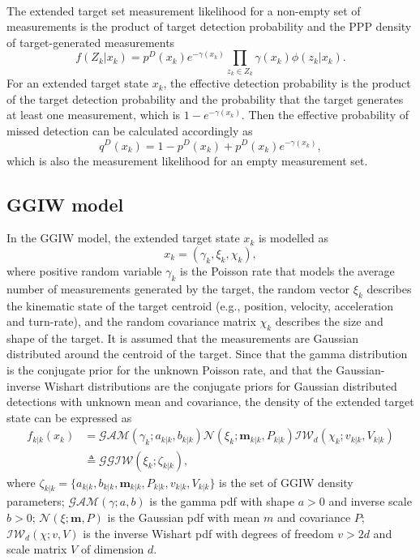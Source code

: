 ~\\
The extended target set measurement likelihood for a non-empty set of measurements is the product of target detection probability and the PPP density of target-generated measurements \cite{pmbmextended2}
\begin{equation}
    f(Z_k|x_k) = p^D(x_k)e^{-\gamma(x_k)}\prod_{z_k\in Z_k}\gamma(x_k)\phi(z_k|x_k).
    \label{eq:extendedlikelihood}
\end{equation}
For an extended target state $x_k$, the effective detection probability is the product of the target detection probability and the probability that the target generates at least one measurement, which is $1-e^{-\gamma(x_k)}$. Then the effective probability of missed detection can be calculated accordingly as
\begin{equation}
    q^D(x_k) = 1 - p^D(x_k) + p^D(x_k)e^{-\gamma(x_k)},
\end{equation}
which is also the measurement likelihood for an empty measurement set.

\subsection{GGIW model}
In the GGIW model, the extended target state $x_k$ is modelled as 
\begin{equation}
    x_k=(\gamma_k,\xi_k,\chi_k),
\end{equation}
where positive random variable $\gamma_k$ is the Poisson rate that models the average number of measurements generated by the target, the random vector $\xi_k$ describes the kinematic state of the target centroid (e.g., position, velocity, acceleration and turn-rate), and the random covariance matrix $\chi_k$ describes the size and shape of the target. It is assumed that the measurements are Gaussian distributed around the centroid of the target. Since that the gamma distribution is the conjugate prior for the unknown Poisson rate, and that the Gaussian-inverse Wishart distributions are the conjugate priors for Gaussian distributed detections with unknown mean and covariance, the density of the extended target state can be expressed as
\begin{align}
f_{k|k}(x_k) &= \mathcal{GAM}(\gamma_k;a_{k|k},b_{k|k})\mathcal{N}(\xi_k;\mathbf{m}_{k|k},P_{k|k})\mathcal{IW}_d(\chi_k;v_{k|k},V_{k|k}) \\
&\triangleq \mathcal{GGIW}(\xi_k;\zeta_{k|k}),
\end{align}
where $\zeta_{k|k} = \{a_{k|k},b_{k|k},\mathbf{m}_{k|k},P_{k|k},v_{k|k},V_{k|k}\}$ is the set of GGIW density parameters; $\mathcal{GAM}(\gamma;a,b)$ is the gamma pdf with shape $a>0$ and inverse scale $b>0$; $\mathcal{N}(\xi;\mathbf{m},P)$ is the Gaussian pdf with mean $m$ and covariance $P$; $\mathcal{IW}_d(\chi;v,V)$ is the inverse Wishart pdf with degrees of freedom $v>2d$ and scale matrix $V$ of dimension $d$.

